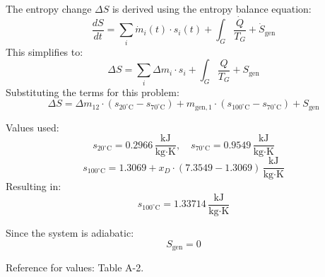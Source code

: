 The entropy change \( \Delta S \) is derived using the entropy balance equation:  
\[
\frac{dS}{dt} = \sum_i \dot{m}_i(t) \cdot s_i(t) + \int_G \frac{\dot{Q}}{T_G} + \dot{S}_{\text{gen}}
\]  
This simplifies to:  
\[
\Delta S = \sum_i \Delta m_i \cdot s_i + \int_G \frac{Q}{T_G} + S_{\text{gen}}
\]  
Substituting the terms for this problem:  
\[
\Delta S = \Delta m_{12} \cdot (s_{20^\circ\text{C}} - s_{70^\circ\text{C}}) + m_{\text{gen},1} \cdot (s_{100^\circ\text{C}} - s_{70^\circ\text{C}}) + S_{\text{gen}}
\]  

Values used:  
\[
s_{20^\circ\text{C}} = 0.2966 \, \frac{\text{kJ}}{\text{kg·K}}, \quad s_{70^\circ\text{C}} = 0.9549 \, \frac{\text{kJ}}{\text{kg·K}}
\]  
\[
s_{100^\circ\text{C}} = 1.3069 + x_D \cdot (7.3549 - 1.3069) \, \frac{\text{kJ}}{\text{kg·K}}
\]  
Resulting in:  
\[
s_{100^\circ\text{C}} = 1.33714 \, \frac{\text{kJ}}{\text{kg·K}}
\]  

Since the system is adiabatic:  
\[
S_{\text{gen}} = 0
\]  

Reference for values: Table A-2.